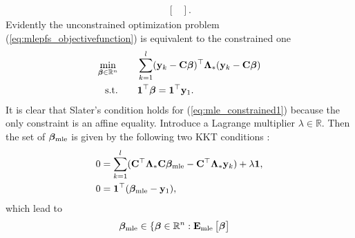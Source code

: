 \documentclass[a4paper, 11pt]{article}
\newcommand{\R}{\mathbb{R}}
\newcommand{\1}{\mathbf{1}}
\newcommand{\xb}{\mathbf{x}}
\newcommand{\yb}{\mathbf{y}}
\newcommand{\Cb}{\mathbf{C}}
\newcommand{\betab}{\bm{\beta}}
\newcommand{\Lambdab}{\bm{\Lambda}}
\newcommand{\betamlens}{\hat{\betab}_{\textnormal{mle}}}
\newcommand{\betamlefs}{{\betab}_{\textnormal{mle}}}
\newcommand{\emlefs}{\mathbf{E}_{\textnormal{mle}}}
\begin{document}
{{\begin{equation}
\begin{aligned}
\begin{bmatrix}
		\end{bmatrix}.
		\end{aligned}
		\end{equation}
		Evidently the unconstrained optimization problem (\ref{eq:mlepfs_objectivefunction}) is equivalent to the constrained one
		\begin{equation} \label{eq:mle_constrained1}
		\begin{aligned}
		\min_{\betab\in\R^n}\qquad &  \sum\limits_{k=1}^l(\yb_k-\Cb\betab)^\top\Lambdab_\ast (\yb_k-\Cb\betab) \\
		{\rm s.t.} \qquad  &   \1^\top\betab=\1^\top\yb_1.
		\end{aligned}
		\end{equation}
		It is clear that Slater's condition holds for (\ref{eq:mle_constrained1}) because the only constraint is an affine equality. Introduce a Lagrange multiplier $\lambda\in\R$. Then the set of $\betamlefs$ is given by the following two KKT conditions \cite{boyd2004}:
		\begin{equation}\notag
		\begin{aligned}
		0 &= \sum\limits_{k=1}^l (\Cb^\top\Lambdab_\ast \Cb\betamlefs-\Cb^\top\Lambdab_\ast \yb_k)+\lambda\1,\\
		0 &= \1^\top(\betamlefs-\yb_1),
		\end{aligned}
		\end{equation}
		which lead to
		\begin{equation}\notag
		\begin{aligned}
		\betamlefs&\in\{\betab\in\R^n:\emlefs
		\begin{bmatrix}
		\betab\\

\end{bmatrix}
\end{aligned}
\end{equation}}}
\end{document}
